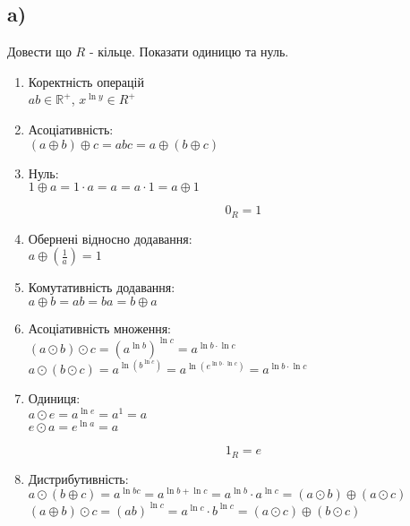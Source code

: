 \documentclass[11pt, a4paper]{article} %
\newcommand{\R}{\mathbb{R}}
\begin{document}
\subsection*{a)}
\begin{mdframed}
    Довести що $R$ - кільце. Показати одиницю та нуль.
\end{mdframed}
\begin{enumerate}
    \item Коректність операцій\\
    $ab \in \R^+$, $x^{\ln y} \in R^+$
    \item Асоціативність: \\
    $(a \oplus b) \oplus c = abc = a \oplus (b\oplus c)$
    \item Нуль: \\
    $1 \oplus a = 1\cdot a = a = a \cdot 1 = a \oplus 1$\\
    \begin{mdframed}[backgroundcolor=yellow!20]
        \[0_R = 1\]
    \end{mdframed}
    \item Обернені відносно додавання:\\
    $a \oplus (\frac{1}{a}) = 1$
    \item Комутативність додавання:\\
    $a \oplus b = ab = ba = b \oplus a$
    \item Асоціативність множення:\\
    $(a \odot b) \odot c = (a^{\ln b})^{\ln c} = a^{\ln b \cdot \ln c}$\\
    $a \odot (b\odot c) = a^{\ln \left(b^{\ln c}\right)} = a^{\ln \left(e^{\ln b \cdot \ln c}\right)} = a^{\ln b \cdot \ln c}$
    \item Одиниця:\\
    $a \odot e = a^{\ln e} = a^1 = a$\\
    $e \odot a = e^{\ln a} = a$\\
    \begin{mdframed}[backgroundcolor=yellow!20]
        \[1_R = e\]
    \end{mdframed}
    \item Дистрибутивність:\\
    $a\odot (b\oplus c) = a^{\ln bc} = a^{\ln b + \ln c} = a^{\ln b}\cdot a^{\ln c} = (a\odot b) \oplus (a\odot c)$\\
    $(a\oplus b)\odot c = (ab)^{\ln c} = a^{\ln c} \cdot b^{\ln c} = (a\odot c) \oplus (b\odot c)$
\end{enumerate}
\end{document}
